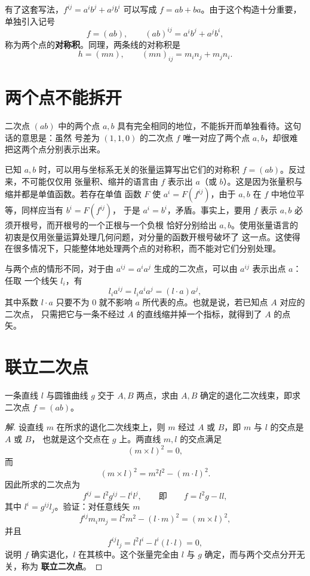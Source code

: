 有了这套写法，$f^{ij}=a^ib^j+a^jb^i$ 可以写成 $f=ab+ba$。由于这个构造十分重要，单独引入记号
\[
f=(ab),\qquad (ab)^{ij}=a^ib^j+a^jb^i,
\]
称为两个点的\textbf{对称积}。同理，两条线的对称积是
\[
h=(mn),\qquad (mn)_{ij}=m_in_j+m_jn_i .
\]

\section{两个点不能拆开}

二次点 $(ab)$ 中的两个点 $a,b$ 具有完全相同的地位，不能拆开而单独看待。这句话的意思是：虽然
号差为 $(1,1,0)$ 的二次点 $f$ 唯一对应了两个点 $a,b$，却很难把这两个点分别表示出来。

已知 $a,b$ 时，可以用与坐标系无关的张量运算写出它们的对称积 $f=(ab)$。反过来，不可能仅仅用
张量积、缩并的语言由 $f$ 表示出 $a$（或 $b$）。这是因为张量积与缩并都是单值函数。若存在单值
函数 $F$ 使 $a^i=F(f^{ij})$，由于 $a,b$ 在 $f$ 中地位平等，同样应当有 $b^i=F(f^{ij})$，
于是 $a^i=b^i$，矛盾。事实上，要用 $f$ 表示 $a,b$ 必须开根号，而开根号的一个正根与一个负根
恰好分别给出 $a,b$。使用张量语言的初衷是仅用张量运算处理几何问题，对分量的函数开根号破坏了
这一点。这使得在很多情况下，只能整体地处理两个点的对称积，而不能对它们分别处理。

与两个点的情形不同，对于由 $a^{ij}=a^ia^j$ 生成的二次点，可以由 $a^{ij}$ 表示出点 $a$：任取
一个线矢 $l_i$，有
\[
l_ia^{ij}=l_ia^ia^j=(l\cdot a)a^j,
\]
其中系数 $l\cdot a$ 只要不为 $0$ 就不影响 $a$ 所代表的点。也就是说，若已知点 $A$ 对应的二次点，
只需把它与一条不经过 $A$ 的直线缩并掉一个指标，就得到了 $A$ 的点矢。

\section{联立二次点}

\begin{example}
\label{ex:joined}
一条直线 $l$ 与圆锥曲线 $g$ 交于 $A,B$ 两点，求由 $A,B$ 确定的退化二次线束，即求二次点
$f=(ab)$。
\end{example}

\begin{proof}[解]
设直线 $m$ 在所求的退化二次线束上，则 $m$ 经过 $A$ 或 $B$，即 $m$ 与 $l$ 的交点是 $A$ 或 $B$，
也就是这个交点在 $g$ 上。两直线 $m,l$ 的交点满足
\[
(m\times l)^2=0,
\]
而
\[
(m\times l)^2=m^2l^2-(m\cdot l)^2 .
\]
因此所求的二次点为
\[
f^{ij}=l^2g^{ij}-l^il^j,\qquad\text{即}\qquad f=l^2g-ll,
\]
其中 $l^i=g^{ij}l_j$。验证：对任意线矢 $m$
\[
f^{ij}m_im_j=l^2m^2-(l\cdot m)^2=(m\times l)^2,
\]
并且
\[
f^{ij}l_j=l^2l^i-l^i(l\cdot l)=0,
\]
说明 $f$ 确实退化，$l$ 在其核中。这个张量完全由 $l$ 与 $g$ 确定，而与两个交点分开无关，称为
\textbf{联立二次点}。
\end{proof}

